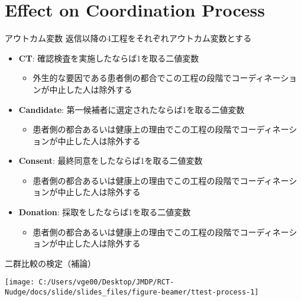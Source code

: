 \documentclass[
      aspectratio=169,
        12pt,
    ]{beamer}
\renewcommand{\textbf}[1]{{\color{DarkBlue}\bfseries#1}}
\providecommand{\tightlist}{%
  \setlength{\itemsep}{0pt}\setlength{\parskip}{0pt}}
\begin{document}
\hypertarget{effect-on-coordination-process}{%
\section{Effect on Coordination Process}\label{effect-on-coordination-process}}

\begin{frame}{アウトカム変数}
\protect\hypertarget{ux30a2ux30a6ux30c8ux30abux30e0ux5909ux6570-1}{}
返信以降の4工程をそれぞれアウトカム変数とする

\begin{itemize}
\tightlist
\item
  \textbf{CT}: 確認検査を実施したならば1を取る二値変数

  \begin{itemize}
  \tightlist
  \item
    外生的な要因である患者側の都合でこの工程の段階でコーディネーションが中止した人は除外する
  \end{itemize}
\item
  \textbf{Candidate}: 第一候補者に選定されたならば1を取る二値変数

  \begin{itemize}
  \tightlist
  \item
    患者側の都合あるいは健康上の理由でこの工程の段階でコーディネーションが中止した人は除外する
  \end{itemize}
\item
  \textbf{Consent}: 最終同意をしたならば1を取る二値変数

  \begin{itemize}
  \tightlist
  \item
    患者側の都合あるいは健康上の理由でこの工程の段階でコーディネーションが中止した人は除外する
  \end{itemize}
\item
  \textbf{Donation}: 採取をしたならば1を取る二値変数

  \begin{itemize}
  \tightlist
  \item
    患者側の都合あるいは健康上の理由でこの工程の段階でコーディネーションが中止した人は除外する
  \end{itemize}
\end{itemize}
\end{frame}

\begin{frame}{二群比較の検定（補論）}
\protect\hypertarget{ux4e8cux7fa4ux6bd4ux8f03ux306eux691cux5b9aux88dcux8ad6-1}{}
\begin{center}\texttt{[image: C:/Users/vge00/Desktop/JMDP/RCT-Nudge/docs/slide/slides\_files/figure-beamer/ttest-process-1]} \end{center}
\end{frame}
\end{document}
